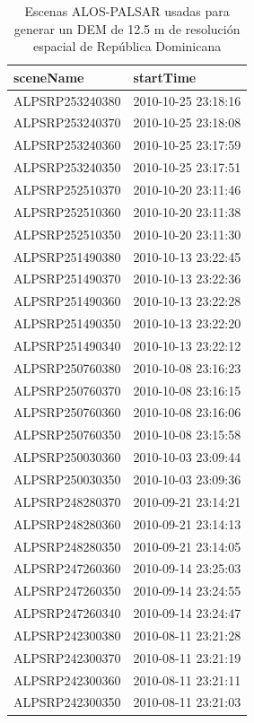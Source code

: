 \documentclass[spanish]{article}
\begin{document}
\begin{table}[H]
\caption{\label{tab:tablaindice}Escenas ALOS-PALSAR usadas para generar un DEM de 12.5 m de
                        resolución espacial de República Dominicana}
\centering
\begin{tabu} to 
\toprule
sceneName & startTime\\
\midrule
ALPSRP253240380 & 2010-10-25 23:18:16\\
ALPSRP253240370 & 2010-10-25 23:18:08\\
ALPSRP253240360 & 2010-10-25 23:17:59\\
ALPSRP253240350 & 2010-10-25 23:17:51\\
ALPSRP252510370 & 2010-10-20 23:11:46\\
\addlinespace
ALPSRP252510360 & 2010-10-20 23:11:38\\
ALPSRP252510350 & 2010-10-20 23:11:30\\
ALPSRP251490380 & 2010-10-13 23:22:45\\
ALPSRP251490370 & 2010-10-13 23:22:36\\
ALPSRP251490360 & 2010-10-13 23:22:28\\
\addlinespace
ALPSRP251490350 & 2010-10-13 23:22:20\\
ALPSRP251490340 & 2010-10-13 23:22:12\\
ALPSRP250760380 & 2010-10-08 23:16:23\\
ALPSRP250760370 & 2010-10-08 23:16:15\\
ALPSRP250760360 & 2010-10-08 23:16:06\\
\addlinespace
ALPSRP250760350 & 2010-10-08 23:15:58\\
ALPSRP250030360 & 2010-10-03 23:09:44\\
ALPSRP250030350 & 2010-10-03 23:09:36\\
ALPSRP248280370 & 2010-09-21 23:14:21\\
ALPSRP248280360 & 2010-09-21 23:14:13\\
\addlinespace
ALPSRP248280350 & 2010-09-21 23:14:05\\
ALPSRP247260360 & 2010-09-14 23:25:03\\
ALPSRP247260350 & 2010-09-14 23:24:55\\
ALPSRP247260340 & 2010-09-14 23:24:47\\
ALPSRP242300380 & 2010-08-11 23:21:28\\
\addlinespace
ALPSRP242300370 & 2010-08-11 23:21:19\\
ALPSRP242300360 & 2010-08-11 23:21:11\\
ALPSRP242300350 & 2010-08-11 23:21:03\\
\bottomrule
\end{tabu}
\end{table}
\end{document}

